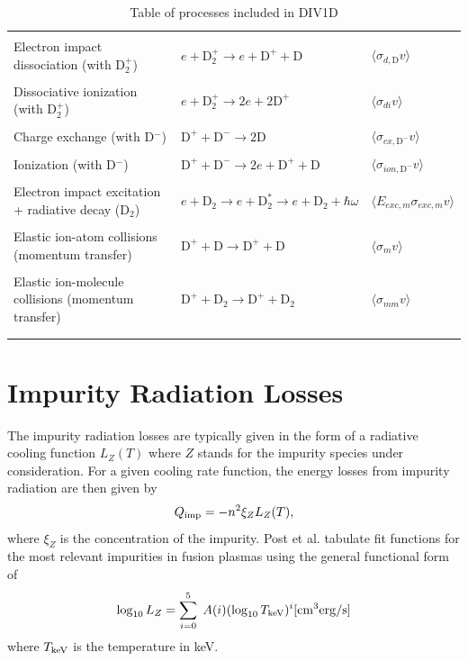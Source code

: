 \documentclass[amsmath,amssymb,a4]{revtex4-2}
\begin{document}
\begin{longtable}[c]{|l|l|l|}
 & &\\
Electron impact dissociation (with D$_2^+$) &  $e+\text{D}_2^+\rightarrow e + \text{D}^+ + \text{D}$ & $\langle \sigma_{d,\mathrm{D}} v\rangle $ \\
 & &\\
Dissociative ionization (with D$_2^+$) &  $e+\text{D}_2^+\rightarrow 2e + 2\text{D}^+$ & $\langle \sigma_{di} v\rangle $\\
 & &\\
Charge exchange (with D$^-$)&  $\text{D}^++\text{D}^-\rightarrow 2\text{D}$ & $\langle \sigma_{cx,\mathrm{D}^-} v\rangle $\\
 & &\\
Ionization (with D$^-$) &  $\text{D}^++\text{D}^-\rightarrow 2e + \text{D}^+ + \text{D}$ & $\langle \sigma_{ion,\mathrm{D}^-} v\rangle $ \\
 & &\\
Electron impact excitation + radiative decay (D$_2$)& $e+\mathrm{D}_2\rightarrow e + \mathrm{D}_2^* \rightarrow e+\mathrm{D}_2+ \hbar\omega$ & $\langle E_{exc,m}\sigma_{exc,m} v\rangle $ \\
 & &\\
Elastic ion-atom collisions (momentum transfer) & $\mathrm{D}^+ +\mathrm{D}\rightarrow \mathrm{D}^+ + \mathrm{D}$ & $\langle \sigma_{m} v\rangle $ \\
 & &\\
Elastic ion-molecule collisions (momentum transfer) & $\mathrm{D}^++\mathrm{D}_2\rightarrow \mathrm{D}^+ + \mathrm{D}_2$ & $\langle \sigma_{mm} v\rangle $ \\
& & \\
\hline
\caption{Table of processes included in DIV1D}
\label{tab:rea_ref}
\end{longtable}


\section{Impurity Radiation Losses}

The impurity radiation losses are typically given in the form of a radiative cooling function $L_Z(T)$ where $Z$ stands for the impurity species under consideration. For a given cooling rate function, the energy losses from impurity radiation are then given by
\begin{equation}\label{impurity_radiation}
    Q_{\rm imp} = - n^2 \xi_Z L_Z(T),
\end{equation}
where $\xi_Z$ is the concentration of the impurity. Post et al.\cite{post1977} tabulate fit functions for the most relevant impurities in fusion plasmas using the general functional form of \cite{post1977}
\begin{equation}\label{cooling_rate}
    \log_{10} L_Z = \sum_{i=0}^5 \; A(i) (\log_{10} T_{\rm keV})^i [{\rm cm}^3 {\rm erg/s}]
\end{equation}
where $T_{\rm keV}$ is the temperature in keV.
\end{document}
